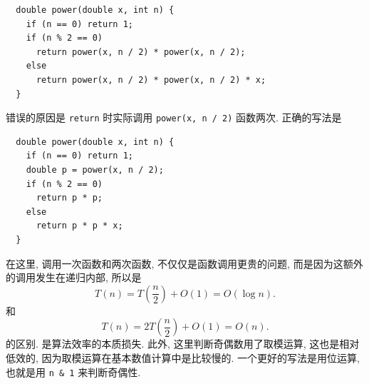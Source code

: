 \documentclass[a4paper]{ctexart}
\theoremstyle{definition}
\theoremstyle{definition}
\begin{document}
\begin{verbatim}
  double power(double x, int n) { 
    if (n == 0) return 1;
    if (n % 2 == 0)
      return power(x, n / 2) * power(x, n / 2);
    else 
      return power(x, n / 2) * power(x, n / 2) * x; 
  }
\end{verbatim}

错误的原因是 \verb|return| 时实际调用 \verb|power(x, n / 2)| 函数两次.
正确的写法是 

\begin{verbatim}
  double power(double x, int n) { 
    if (n == 0) return 1;
    double p = power(x, n / 2);
    if (n % 2 == 0)
      return p * p;
    else 
      return p * p * x;
  }
\end{verbatim}

在这里, 调用一次函数和两次函数, 不仅仅是函数调用更贵的问题, 而是因为这额外的调用发生在递归内部, 
所以是
\begin{equation}
  T(n) = T(\frac{n}{2}) + O(1) = O(\log n).
\end{equation}
和
\begin{equation}
  T(n) = 2T(\frac{n}{2}) + O(1) = O(n).
\end{equation}
的区别. 是算法效率的本质损失. 此外, 这里判断奇偶数用了取模运算, 这也是相对低效的, 
因为取模运算在基本数值计算中是比较慢的. 一个更好的写法是用位运算, 
也就是用 \verb|n & 1| 来判断奇偶性.


\end{document}

